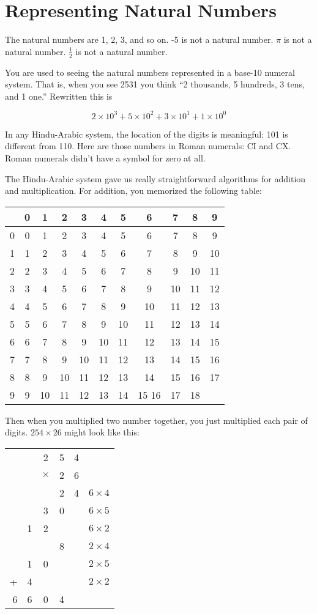\chapter{Representing Natural Numbers}

The natural numbers are 1, 2, 3, and so on.  -5 is not a natural
number.  $\pi$ is not a natural number. $\frac{1}{2}$ is not a natural
number.

You are used to seeing the natural numbers represented in a base-10
 numeral system.  That is, when you see 2531 you
think ``2 thousands, 5 hundreds, 3 tens, and 1 one.''  Rewritten this is

$$2 \times 10^3 + 5 \times 10^2 + 3 \times 10^1 + 1 \times 10^0$$

In any Hindu-Arabic system, the location of the digits is meaningful:
101 is different from 110.  Here are those numbers in Roman numerals:
CI and CX.  Roman numerals didn't have a symbol for zero at all.

The Hindu-Arabic system gave us really straightforward algorithms for
addition and multiplication.  For addition, you memorized the following table:

\begin{tabular}{ c || c | c | c | c | c | c| c| c| c| c }
  & 0 & 1 & 2 & 3 & 4 & 5 & 6 & 7 & 8 & 9 \\
  \hline
0 & 0 & 1 & 2 & 3 & 4 & 5 & 6 & 7 & 8 & 9 \\
1 & 1 & 2 & 3 & 4 & 5 & 6 & 7 & 8 & 9 & 10 \\
2 & 2 & 3 & 4 & 5 & 6 & 7 & 8 & 9 & 10 & 11\\
3 & 3 & 4 & 5 & 6 & 7 & 8 & 9 & 10 & 11 & 12\\
4 & 4 & 5 & 6 & 7 & 8 & 9 & 10 & 11 & 12 & 13\\
5 & 5 & 6 & 7 & 8 & 9 & 10 & 11 & 12 & 13 & 14\\
6 & 6 & 7 & 8 & 9 & 10 & 11 & 12 & 13 & 14 & 15\\
7 & 7 & 8 & 9 & 10 & 11 & 12 & 13 & 14 & 15 & 16\\
8 & 8 & 9 & 10 & 11 & 12 & 13 & 14 & 15 & 16 & 17\\
9 & 9 & 10 & 11 & 12 & 13 & 14 & 15 16 & 17 & 18\\
\end{tabular}

Then when you multiplied two number together, you just multiplied each
pair of digits. $254 \times 26$  might look like this:

\begin{tabular} {r c c c c | c}
 & & 2 & 5 & 4 & \\
 & & $\times$  & 2 & 6 & \\
  \hline
&  &   & 2 & 4 & $6 \times 4$\\
&  & 3 & 0 & & $6 \times 5$  \\
&  1 & 2 & & & $6 \times 2$  \\
&  &  &  8 & & $2 \times 4$ \\
& 1 & 0 & & & $2 \times 5$\\
+ & 4 &  & & & $2 \times 2$\\
 \hline
 6 & 6 & 0 & 4
 \end{tabular}
  


